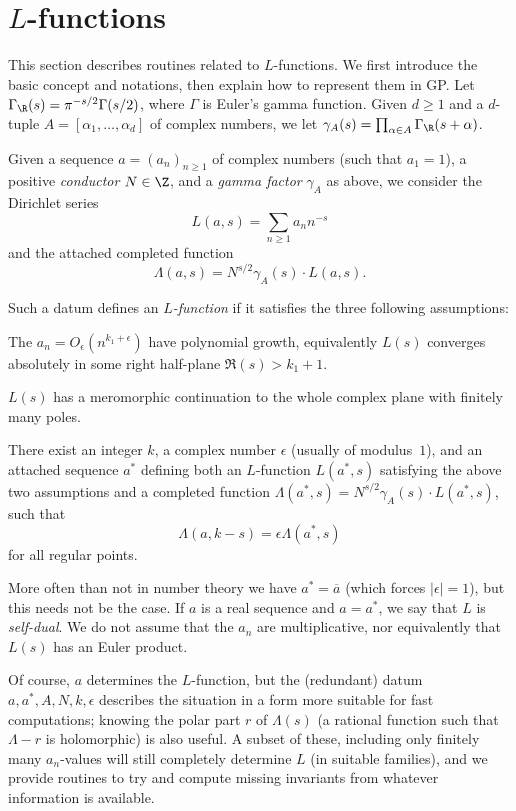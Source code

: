 
\section{$L$-functions}

This section describes routines related to $L$-functions. We first introduce
the basic concept and notations, then explain how to represent them in GP.
Let $\Gamma_\R(s) = \pi^{-s/2}\Gamma(s/2)$, where $\Gamma$ is Euler's gamma
function. Given $d \geq 1$ and a $d$-tuple $A=[\alpha_1,\dots,\alpha_d]$ of
complex numbers, we let $\gamma_A(s) = \prod_{\alpha \in A} \Gamma_\R(s +
\alpha)$.

Given a sequence $a = (a_n)_{n\geq 1}$ of complex numbers (such that $a_1 = 1$),
a positive \emph{conductor} $N \in \Z$, and a \emph{gamma factor}
$\gamma_A$ as above, we consider the Dirichlet series
$$ L(a,s) = \sum_{n\geq 1} a_n n^{-s} $$
and the attached completed function
$$ \Lambda(a,s) = N^{s/2}\gamma_A(s) \cdot L(a,s). $$

Such a datum defines an \emph{$L$-function} if it satisfies the three
following assumptions:

\item [Convergence] The $a_n = O_\epsilon(n^{k_1+\epsilon})$ have polynomial
growth, equivalently $L(s)$ converges absolutely in some right half-plane
$\Re(s) > k_1 + 1$.

\item [Analytic continuation] $L(s)$ has a meromorphic continuation to the
whole complex plane with finitely many poles.

\item [Functional equation] There exist an integer $k$, a complex number
$\epsilon$ (usually of modulus~$1$), and an attached sequence $a^*$
defining both an $L$-function $L(a^*,s)$ satisfying the above two assumptions
and a completed function $\Lambda(a^*,s) = N^{s/2}\gamma_A(s) \cdot
L(a^*,s)$, such that
$$\Lambda(a,k-s) = \epsilon \Lambda(a^*,s)$$
for all regular points.

More often than not in number theory we have $a^* = \overline{a}$ (which
forces $|\epsilon| = 1$), but this needs not be the case. If $a$ is a real
sequence and $a = a^*$, we say that $L$ is \emph{self-dual}. We do not assume
that the $a_n$ are multiplicative, nor equivalently that $L(s)$ has an Euler
product.

Of course, $a$ determines the $L$-function, but the (redundant) datum $a,a^*,
A, N, k, \epsilon$ describes the situation in a form more suitable for fast
computations; knowing the polar part $r$ of $\Lambda(s)$ (a rational function
such that $\Lambda-r$ is holomorphic) is also useful. A subset of these,
including only finitely many $a_n$-values will still completely determine $L$
(in suitable families), and we provide routines to try and compute missing
invariants from whatever information is available.

